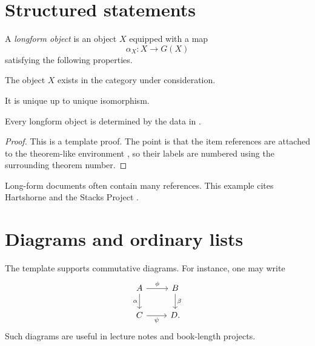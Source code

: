 \section{Structured statements}

\begin{definition}
    \label{definition:longform-object}
    A \emph{longform object} is an object \(X\) equipped with a map
    \[
        \alpha_X \colon X \to G(X)
    \]
    satisfying the following properties.
    \begin{theoremitems}
    \item The object \(X\) exists in the category under consideration.
        \label{item:longform-existence}
    \item It is unique up to unique isomorphism.
        \label{item:longform-uniqueness} 
    \end{theoremitems}
\end{definition}

\begin{proposition}
    \label{proposition:longform-main}
    Every longform object is determined by the data in
    .
\end{proposition}

\begin{proof}
    This is a template proof. The point is that the item references are attached to
    the theorem-like environment , so their labels
    are numbered using the surrounding theorem number.
\end{proof}

\begin{remark}
    \label{remark:longform-citations}
    Long-form documents often contain many references.
    This example cites Hartshorne \cite{har77} and the Stacks Project \cite{stacks}.
\end{remark}

\section{Diagrams and ordinary lists}

The template supports commutative diagrams. For instance, one may write
\[
    \begin{tikzcd}
        A \arrow[r, "\phi"] \arrow[d, "\alpha"'] &
        B \arrow[d, "\beta"] \\
        C \arrow[r, "\psi"'] &
        D .
    \end{tikzcd}
\]
Such diagrams are useful in lecture notes and book-length projects.

